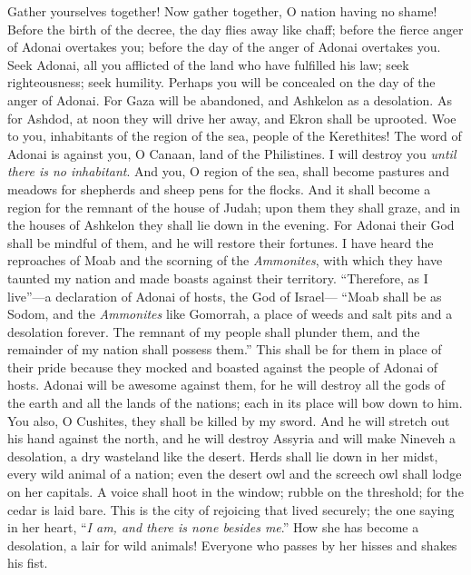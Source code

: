 \begin{biblechapter} %
 Gather yourselves together! Now gather together, 
O nation having no shame!
\verse Before the birth of the decree, 
the day flies away like chaff; 
before the fierce anger of Adonai overtakes you; 
before the day of the anger of Adonai overtakes you.
\verse Seek Adonai, all you afflicted of the land 
who have fulfilled his law; 
seek righteousness; 
seek humility. 
Perhaps you will be concealed 
on the day of the anger of Adonai.
\verse For Gaza will be abandoned, 
and Ashkelon as a desolation. 
As for Ashdod, at noon they will drive her away, 
and Ekron shall be uprooted.
\verse Woe to you, inhabitants of the region of the sea, 
people of the Kerethites! 
The word of Adonai is against you, 
O Canaan, land of the Philistines. 
I will destroy you \textit{until there is no inhabitant}.
\verse And you, O region of the sea, shall become 
pastures and meadows for shepherds 
and sheep pens for the flocks.
\verse And it shall become a region 
for the remnant of the house of Judah; 
upon them they shall graze, 
and in the houses of Ashkelon 
they shall lie down in the evening. 
For Adonai their God shall be mindful of them, 
and he will restore their fortunes.
\verse I have heard the reproaches of Moab 
and the scorning of the \textit{Ammonites}, 
with which they have taunted my nation 
and made boasts against their territory.
\verse “Therefore, as I live”—a declaration of Adonai of hosts, 
the God of Israel— 
“Moab shall be as Sodom, 
and the \textit{Ammonites} like Gomorrah, 
a place of weeds and salt pits 
and a desolation forever. 
The remnant of my people shall plunder them, 
and the remainder of my nation shall possess them.”
\verse This shall be for them in place of their pride 
because they mocked and boasted 
against the people of Adonai of hosts.
\verse Adonai will be awesome against them, 
for he will destroy all the gods of the earth 
and all the lands of the nations; 
each in its place will bow down to him.
\verse You also, O Cushites, 
they shall be killed by my sword.
\verse And he will stretch out his hand against the north, 
and he will destroy Assyria 
and will make Nineveh a desolation, 
a dry wasteland like the desert.
\verse Herds shall lie down in her midst, 
every wild animal of a nation; 
even the desert owl and the screech owl 
shall lodge on her capitals. 
A voice shall hoot in the window; 
rubble on the threshold; 
for the cedar is laid bare.
\verse This is the city of rejoicing 
that lived securely; 
the one saying in her heart, 
“\textit{I am, and there is none besides me}.” 
How she has become a desolation, 
a lair for wild animals! 
Everyone who passes by her hisses and shakes his fist.
\end{biblechapter}

